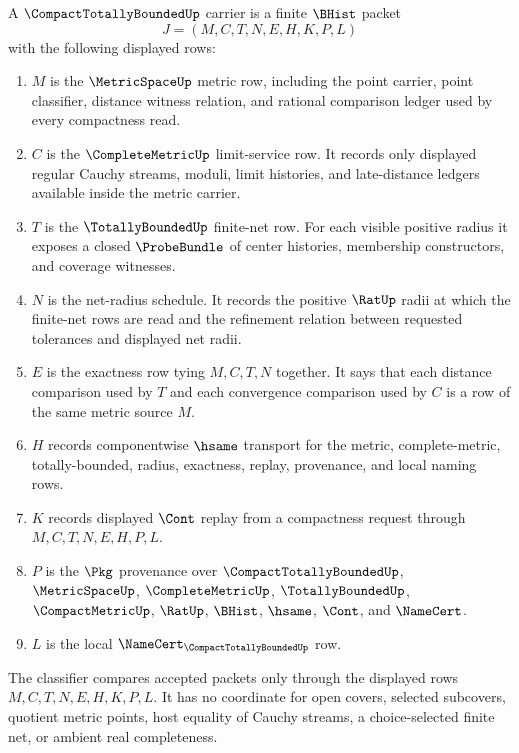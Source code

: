 \begin{definition}
\label{def:compact-totally-bounded-carrier}
A $\CompactTotallyBoundedUp$ carrier is a finite $\BHist$ packet
$$
J=(M,C,T,N,E,H,K,P,L)
$$
with the following displayed rows:
\begin{enumerate}
\item $M$ is the $\MetricSpaceUp$ metric row, including the point carrier, point classifier, distance witness relation, and rational comparison ledger used by every compactness read.
\item $C$ is the $\CompleteMetricUp$ limit-service row. It records only displayed regular Cauchy streams, moduli, limit histories, and late-distance ledgers available inside the metric carrier.
\item $T$ is the $\TotallyBoundedUp$ finite-net row. For each visible positive radius it exposes a closed $\ProbeBundle$ of center histories, membership constructors, and coverage witnesses.
\item $N$ is the net-radius schedule. It records the positive $\RatUp$ radii at which the finite-net rows are read and the refinement relation between requested tolerances and displayed net radii.
\item $E$ is the exactness row tying $M,C,T,N$ together. It says that each distance comparison used by $T$ and each convergence comparison used by $C$ is a row of the same metric source $M$.
\item $H$ records componentwise $\hsame$ transport for the metric, complete-metric, totally-bounded, radius, exactness, replay, provenance, and local naming rows.
\item $K$ records displayed $\Cont$ replay from a compactness request through $M,C,T,N,E,H,P,L$.
\item $P$ is the $\Pkg$ provenance over $\CompactTotallyBoundedUp$, $\MetricSpaceUp$, $\CompleteMetricUp$, $\TotallyBoundedUp$, $\CompactMetricUp$, $\RatUp$, $\BHist$, $\hsame$, $\Cont$, and $\NameCert$.
\item $L$ is the local $\NameCert_{\CompactTotallyBoundedUp}$ row.
\end{enumerate}
The classifier compares accepted packets only through the displayed rows $M,C,T,N,E,H,K,P,L$. It has no coordinate for open covers, selected subcovers, quotient metric points, host equality of Cauchy streams, a choice-selected finite net, or ambient real completeness.
\end{definition}

